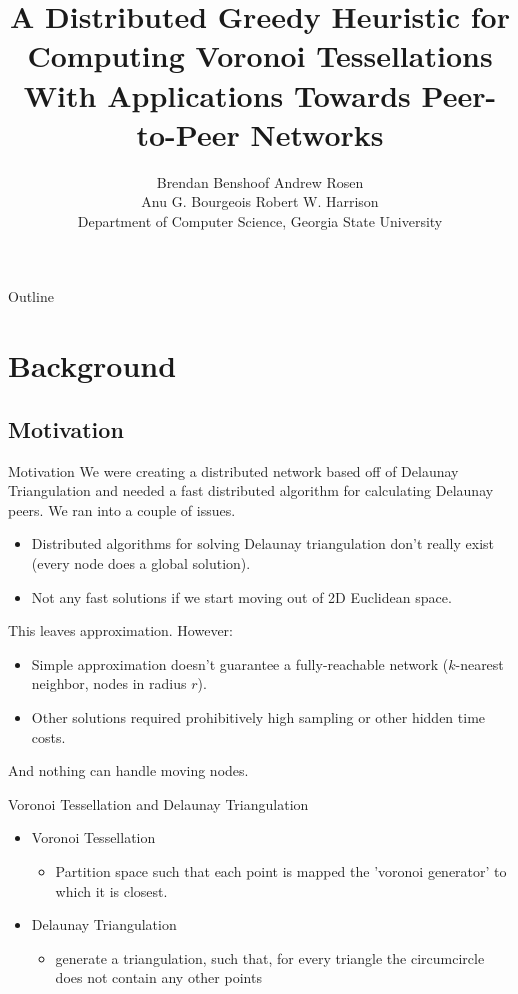 \documentclass[8pt]{beamer}
\title{A Distributed Greedy Heuristic for Computing Voronoi Tessellations With Applications Towards Peer-to-Peer Networks}
\author{Brendan Benshoof \qquad Andrew Rosen \qquad \\Anu G. Bourgeois \qquad Robert W. Harrison \\Department of Computer Science, Georgia State University}
\begin{document}
	\maketitle
	
	
	
\begin{frame}{Outline}
	\tableofcontents
\end{frame}
	
	
\section{Background}
\subsection{Motivation}
	
	\begin{frame}{Motivation}
		We were creating a distributed network based off of Delaunay Triangulation and needed a fast distributed algorithm for calculating Delaunay peers.
		We ran into a couple of issues.
		\begin{itemize}
			\item Distributed algorithms for solving Delaunay triangulation don't really exist (every node does a global solution).
			\item Not any fast solutions if we start moving out of 2D Euclidean space.
		\end{itemize}
		This leaves approximation.  However:
		\begin{itemize}
			\item Simple approximation doesn't guarantee a fully-reachable network ($k$-nearest neighbor, nodes in radius $r$).
			\item Other solutions \cite{voronet} required prohibitively high sampling or other hidden time costs.
		\end{itemize}
		And nothing can handle moving nodes.
	\end{frame}		
	
	\begin{frame}{Voronoi Tessellation and Delaunay Triangulation}
		\begin{itemize}
			\item Voronoi Tessellation
				\begin{itemize}
					\item Partition space such that each point is mapped the 'voronoi generator' to which it is closest.
				\end{itemize}
			\item Delaunay Triangulation
				\begin{itemize}
					\item generate a triangulation, such that, for every triangle the circumcircle does not contain any other points 
				\end{itemize}
		\end{itemize}
	\end{frame}
			
\end{document}
